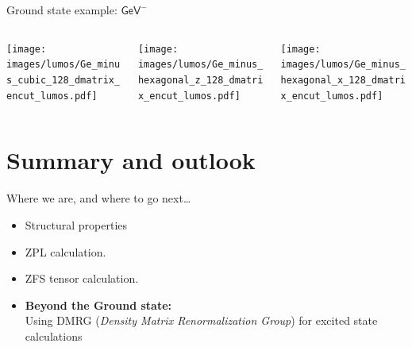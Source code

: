 \documentclass[]{beamer}
\begin{document}
  
\begin{frame}{Ground state example: $ \mathsf{GeV}^{-} $ }
  \begin{center}
    \begin{columns}
      \begin{column}{0.3\textwidth}
        \texttt{[image: images/lumos/Ge\_minus\_cubic\_128\_dmatrix\_encut\_lumos.pdf]}
      \end{column}
      \begin{column}{0.3\textwidth}
        \texttt{[image: images/lumos/Ge\_minus\_hexagonal\_z\_128\_dmatrix\_encut\_lumos.pdf]}
      \end{column}
      \begin{column}{0.3\textwidth}
        \texttt{[image: images/lumos/Ge\_minus\_hexagonal\_x\_128\_dmatrix\_encut\_lumos.pdf]}
      \end{column}
    \end{columns}
  \end{center}
\end{frame}



\section{Summary and outlook} %




\begin{frame}{Where we are, and where to go next\ldots}
  \begin{itemize}
    \item Structural properties
    \item ZPL calculation.
    \item ZFS tensor calculation.
    \item \textbf{Beyond the Ground state:}\\
      Using DMRG (\textit{Density Matrix Renormalization Group}) for excited state calculations
  \end{itemize}
\end{frame}
\end{document}
